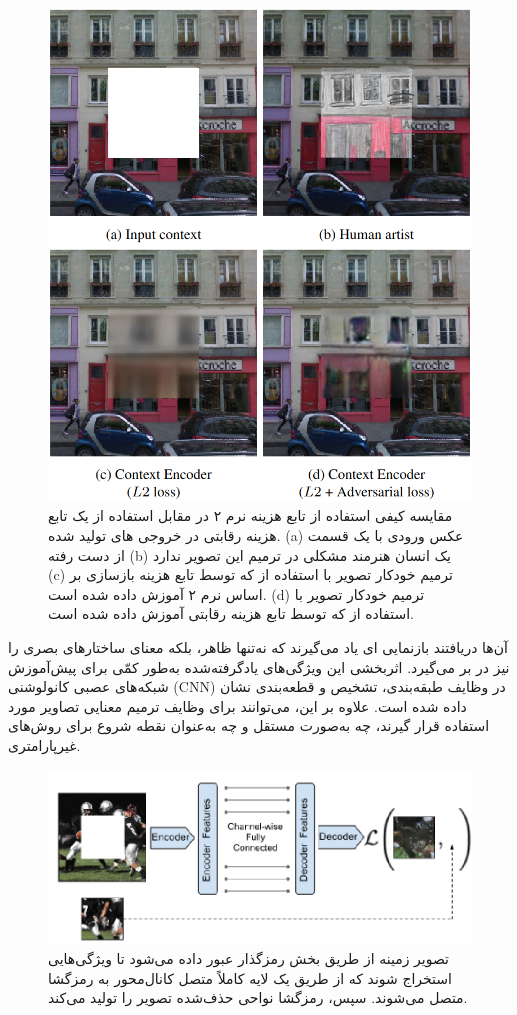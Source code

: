 \begin{figure}
	\centering
	\includegraphics[width=0.7\linewidth]{figs/contextencodersLossComparison}
	\caption{مقایسه کیفی  استفاده از تابع هزینه نرم  ۲ در مقابل استفاده از یک تابع هزینه رقابتی در خروجی های تولید شده. 
		(a) عکس ورودی با یک قسمت از دست رفته 
		(b) یک انسان هنرمند مشکلی در ترمیم این تصویر ندارد 
		(c)
ترمیم خودکار تصویر با استفاده از  که توسط تابع هزینه بازسازی بر اساس نرم ۲ آموزش داده شده است.
	(d)
ترمیم خودکار تصویر با استفاده از  که توسط تابع هزینه رقابتی آموزش داده شده است.
}
	\label{fig:contextencoderslosscomparison}
\end{figure}



آن‌ها دریافتند   بازنمایی ای یاد می‌گیرند که نه‌تنها ظاهر، بلکه معنای ساختارهای بصری را نیز در بر می‌گیرد. اثربخشی این ویژگی‌های یادگرفته‌شده به‌طور کمّی برای پیش‌آموزش شبکه‌های عصبی کانولوشنی (CNN) در وظایف طبقه‌بندی، تشخیص و قطعه‌بندی نشان داده شده است. علاوه بر این،  می‌توانند برای وظایف ترمیم معنایی تصاویر  مورد استفاده قرار گیرند، چه به‌صورت مستقل و چه به‌عنوان نقطه شروع برای روش‌های غیرپارامتری.
\begin{figure}
	\centering
	\includegraphics[width=0.7\linewidth]{figs/contextencodersArchitecture}
	\caption[معماری کلی Context Encoders]{
	تصویر زمینه از طریق بخش رمزگذار عبور داده می‌شود تا ویژگی‌هایی استخراج شوند که از طریق یک لایه کاملاً متصل کانال‌محور به رمزگشا متصل می‌شوند. سپس، رمزگشا نواحی حذف‌شده تصویر را تولید می‌کند.}
	\label{fig:contextencodersarchitecture}
\end{figure}

